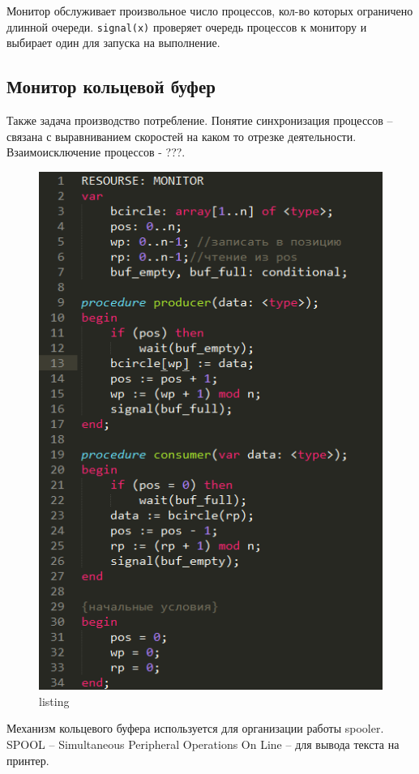 Монитор обслуживает произвольное число процессов, кол-во которых ограничено длинной очереди.  
\verb|signal(x)| проверяет очередь процессов к монитору и выбирает один для запуска на выполнение.

\subsection{Монитор кольцевой буфер}

Также задача производство потребление.
Понятие синхронизация процессов – связана с выравниванием скоростей на каком то отрезке деятельности. 
Взаимоисключение процессов - ???.

\begin{figure}[H]
    \centering
    \includegraphics[width=\textwidth]{listing/4.png}
    \caption{listing}
\end{figure}

Механизм кольцевого буфера используется для организации работы spooler. SPOOL – Simultaneous Peripheral Operations On Line – для вывода текста на принтер.  

